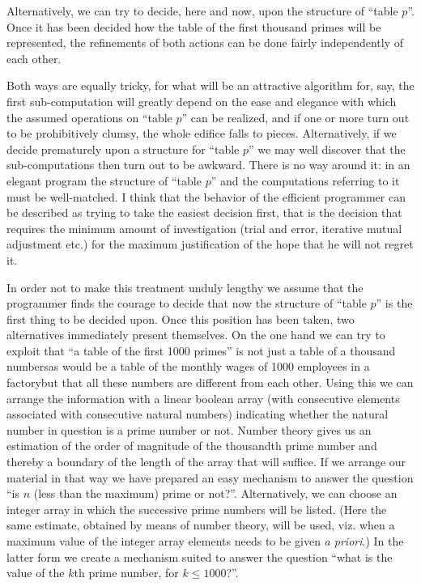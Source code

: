 \documentclass[twoside,11pt]{book}
\begin{document}
Alternatively, we can try to decide, here and now, upon the structure of ``table $p$''. Once it has been decided how the table of the first thousand primes will be represented, the refinements of both actions can be done fairly independently of each other.

Both ways are equally tricky, for what will be an attractive algorithm for, say, the first sub-computation will greatly depend on the ease and elegance with which the assumed operations on ``table $p$'' can be realized, and if one or more turn out to be prohibitively clumsy, the whole edifice falls to pieces. Alternatively, if we decide prematurely upon a structure for ``table $p$'' we may well discover that the sub-computations then turn out to be awkward. There is no way around it: in an elegant program the structure of ``table $p$'' and the computations referring to it must be well-matched. I think that the behavior of the efficient programmer can be described as trying to take the easiest decision first, that is the decision that requires the minimum amount of investigation (trial and error, iterative mutual adjustment etc.) for the maximum justification of the hope that he will not regret it.

In order not to make this treatment unduly lengthy we assume that the programmer finds the courage to decide that now the structure of ``table $p$'' is the first thing to be decided upon. Once this position has been taken, two alternatives immediately present themselves. On the one hand we can try to exploit that ``a table of the first 1000 primes'' is not just a table of a thousand numbers\textemdash{}as would be a table of the monthly wages of 1000 employees in a factory\textemdash{}but that all these numbers are different from each other. Using this we can arrange the information with a linear boolean array (with consecutive elements associated with consecutive natural numbers) indicating whether the natural number in question is a prime number or not. Number theory gives us an estimation of the order of magnitude of the thousandth prime number and thereby a boundary of the length of the array that will suffice. If we arrange our material in that way we have prepared an easy mechanism to answer the question ``is $n$ (less than the maximum) prime or not?''. Alternatively, we can choose an integer array in which the successive prime numbers will be listed. (Here the same estimate, obtained by means of number theory, will be used, viz. when a maximum value of the integer array elements needs to be given \textit{a priori}.) In the latter form we create a mechanism suited to answer the question ``what is the value of the $k$th prime number, for $k \leqslant 1000$?''.
\end{document}
